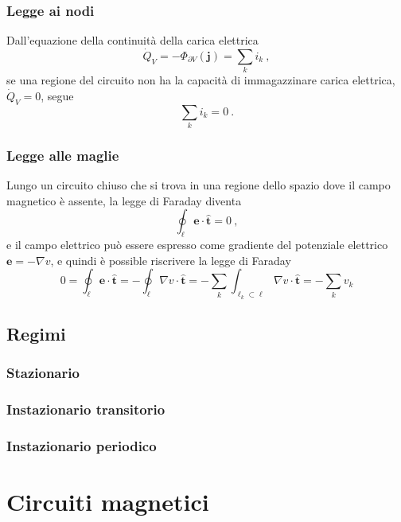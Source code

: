 \subsubsection{Legge ai nodi}
Dall'equazione della continuità della carica elettrica
\begin{equation}
    \dot{Q}_V = - \Phi_{\partial V}(\mathbf{j}) = \sum_k i_k \ ,
\end{equation}
se una regione del circuito non ha la capacità di immagazzinare carica elettrica, $\dot{Q}_V = 0$, segue
\begin{equation}
    \sum_k i_k = 0 \ .
\end{equation}

\subsubsection{Legge alle maglie}
Lungo un circuito chiuso che si trova in una regione dello spazio dove il campo magnetico è assente, la legge di Faraday diventa
\begin{equation}
    \oint_{\ell} \mathbf{e} \cdot \mathbf{\hat{t}} = 0 \ , 
\end{equation}
e il campo elettrico può essere espresso come gradiente del potenziale elettrico $\mathbf{e} = - \nabla v$, e quindi è possible riscrivere la legge di Faraday
\begin{equation}
    0 = \oint_{\ell} \mathbf{e} \cdot \mathbf{\hat{t}} = - \oint_{\ell} \nabla v \cdot \mathbf{\hat{t}} = - \sum_k \int_{\ell_k \subset \ell} \nabla v \cdot \mathbf{\hat{t}} = - \sum_k v_k
\end{equation}

\subsection{Regimi}
\subsubsection{Stazionario}
\subsubsection{Instazionario transitorio}
\subsubsection{Instazionario periodico}

\section{Circuiti magnetici}

